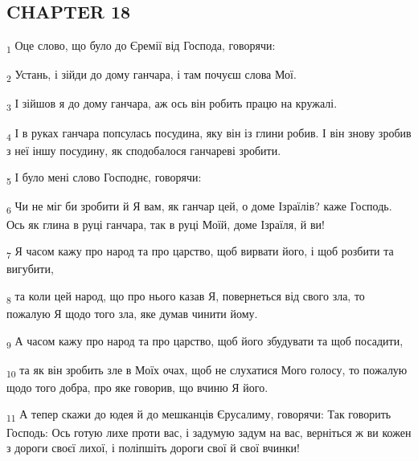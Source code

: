 \subsection{CHAPTER 18}
\begin{tcolorbox}
\textsubscript{1} Оце слово, що було до Єремії від Господа, говорячи:
\end{tcolorbox}
\begin{tcolorbox}
\textsubscript{2} Устань, і зійди до дому ганчара, і там почуєш слова Мої.
\end{tcolorbox}
\begin{tcolorbox}
\textsubscript{3} І зійшов я до дому ганчара, аж ось він робить працю на кружалі.
\end{tcolorbox}
\begin{tcolorbox}
\textsubscript{4} І в руках ганчара попсулась посудина, яку він із глини робив. І він знову зробив з неї іншу посудину, як сподобалося ганчареві зробити.
\end{tcolorbox}
\begin{tcolorbox}
\textsubscript{5} І було мені слово Господнє, говорячи:
\end{tcolorbox}
\begin{tcolorbox}
\textsubscript{6} Чи не міг би зробити й Я вам, як ганчар цей, о доме Ізраїлів? каже Господь. Ось як глина в руці ганчара, так в руці Моїй, доме Ізраїля, й ви!
\end{tcolorbox}
\begin{tcolorbox}
\textsubscript{7} Я часом кажу про народ та про царство, щоб вирвати його, і щоб розбити та вигубити,
\end{tcolorbox}
\begin{tcolorbox}
\textsubscript{8} та коли цей народ, що про нього казав Я, повернеться від свого зла, то пожалую Я щодо того зла, яке думав чинити йому.
\end{tcolorbox}
\begin{tcolorbox}
\textsubscript{9} А часом кажу про народ та про царство, щоб його збудувати та щоб посадити,
\end{tcolorbox}
\begin{tcolorbox}
\textsubscript{10} та як він зробить зле в Моїх очах, щоб не слухатися Мого голосу, то пожалую щодо того добра, про яке говорив, що вчиню Я його.
\end{tcolorbox}
\begin{tcolorbox}
\textsubscript{11} А тепер скажи до юдея й до мешканців Єрусалиму, говорячи: Так говорить Господь: Ось готую лихе проти вас, і задумую задум на вас, верніться ж ви кожен з дороги своєї лихої, і поліпшіть дороги свої й свої вчинки!
\end{tcolorbox}
